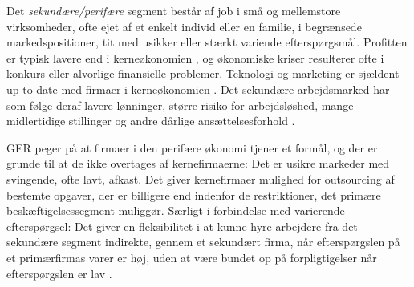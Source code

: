 Det \emph{sekundære/perifære} segment består af job i små og mellemstore virksomheder, ofte ejet af et enkelt individ eller en familie, i begrænsede markedspositioner, tit med usikker eller stærkt variende efterspørgsmål. Profitten er typisk lavere end i kerneøkonomien
, og økonomiske kriser resulterer ofte i konkurs eller alvorlige finansielle problemer. Teknologi og marketing er sjældent up to date med firmaer i kerneøkonomien \parencite[7]{Averitt1968}. Det sekundære arbejdsmarked har som følge deraf lavere lønninger, større risiko for arbejdsløshed, mange midlertidige  stillinger og andre dårlige ansættelsesforhold \parencite[70f]{Doeringer1971}.

GER peger på at firmaer i den perifære økonomi tjener et formål, og der er grunde til at de ikke overtages af kernefirmaerne: Det er usikre markeder med svingende, ofte lavt, afkast. Det giver kernefirmaer mulighed for outsourcing af bestemte opgaver, der er billigere end indenfor de restriktioner, det primære beskæftigelsessegment muliggør. Særligt i forbindelse med varierende efterspørgsel: Det giver en fleksibilitet i at kunne hyre arbejdere fra det sekundære segment indirekte, gennem et sekundært firma, når efterspørgslen på et primærfirmas varer er høj, uden at være bundet op på forpligtigelser når efterspørgslen er lav \parencite[191]{Gordon1982}. 

